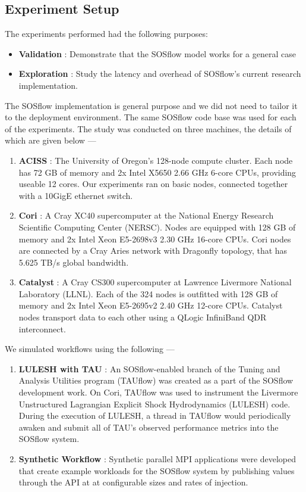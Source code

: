 \subsection{Experiment Setup} %
%
The experiments performed had the following purposes:
%
\begin{itemize}
\item \textbf{Validation} : Demonstrate that the SOSflow model works
  for a general case
%
\item \textbf{Exploration} : Study the latency and overhead of
  SOSflow's current research implementation.
%
\end {itemize}
%
The SOSflow implementation is general purpose and we did not need to
tailor it to the deployment environment.
%
The same SOSflow code base was used for each of the experiments.
%
The study was conducted on three machines, the details of which are
given below ---
%
\begin{enumerate}
%
\item \textbf{ACISS} : The University of Oregon's 128-node compute
  cluster.
%
Each node has 72 GB of memory and 2x Intel X5650 2.66 GHz 6-core CPUs,
providing useable 12 cores.
%
Our experiments ran on basic nodes, connected together with a 10GigE
ethernet switch.
%
%
\item \textbf{Cori} : A Cray XC40 supercomputer at the National Energy Research Scientific
  Computing Center (NERSC).
%
Nodes are equipped with 128 GB of memory and 2x Intel Xeon
E5-2698v3 2.30 GHz 16-core CPUs.
%
Cori nodes are connected by a Cray Aries network with Dragonfly
topology, that has 5.625 TB/s global bandwidth.
%
%
\item \textbf{Catalyst} : A Cray CS300 supercomputer at Lawrence
  Livermore National Laboratory (LLNL).
%
Each of the 324 nodes is outfitted with 128 GB of memory and 2x Intel
Xeon E5-2695v2 2.40 GHz 12-core CPUs.
%
Catalyst nodes transport data to each other using a QLogic InfiniBand
QDR interconnect.
%
\end{enumerate}
%
%
We simulated workflows using the following --- 
%
\begin{enumerate}
%
\item \textbf{LULESH with TAU} : An SOSflow-enabled branch of the
  Tuning and Analysis Utilities program (TAUflow) was created as a
  part of the SOSflow development work.
%
On Cori, TAUflow was used to instrument the Livermore Unstructured
Lagrangian Explicit Shock Hydrodynamics (LULESH) code.
%
During the execution of LULESH, a thread in TAUflow would periodically
awaken and submit all of TAU's observed performance metrics into the
SOSflow system.
%
\item \textbf{Synthetic Workflow} : Synthetic parallel MPI
  applications were developed that create example workloads for the
  SOSflow system by publishing values through the API at at
  configurable sizes and rates of injection.
%
\end{enumerate}
%
%


